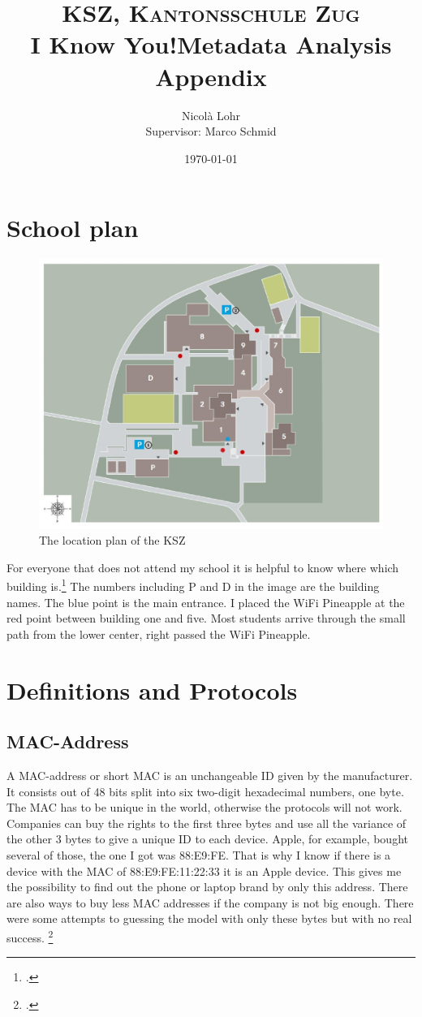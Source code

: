 \documentclass[11pt]{article}
\title{\normalfont \normalsize \textsc{KSZ, Kantonsschule Zug} \\ [25pt]
\huge I Know You!\linebreak\linebreak \large Metadata Analysis \linebreak \large Appendix\\ 
}
\author{Nicolà Lohr\\[0.5cm]{\small Supervisor: Marco Schmid}}
\date{\normalsize\today}
\begin{document}
\clearpage
\thispagestyle{empty}
\newpage
\linespread{0.9}
\tableofcontents
\linespread{1.5}
\newpage

\section {School plan}
\begin{figure}
\centering
\includegraphics [width = \textwidth]{images/lageplan.jpeg}
\caption{The location plan of the KSZ\label{fig:locationplan}}
\end{figure}

For everyone that does not attend my school it is helpful to know where which building is.\footcite{kszlageplan} The numbers including P and D in the image are the building names. The blue point is the main entrance. I placed the WiFi Pineapple at the red point between building one and five. Most students arrive through the small path from the lower center, right passed the WiFi Pineapple.

\section{Definitions and Protocols}

\subsection{MAC-Address}
A MAC-address or short MAC is an unchangeable ID given by the manufacturer. It consists out of 48 bits split into six two-digit hexadecimal numbers, one byte. The MAC has to be unique in the world, otherwise the protocols will not work. 
Companies can buy the rights to the first three bytes and use all the variance of the other 3 bytes to give a unique ID to each device. Apple, for example, bought several of those, the one I got was 88:E9:FE. That is why I know if there is a device with the MAC of 88:E9:FE:11:22:33 it is an Apple device. This gives me the possibility to find out the phone or laptop brand by only this address. There are also ways to buy less MAC addresses if the company is not big enough. There were some attempts to guessing the model with only these bytes but with no real success.
\footcite{macaddress}
\end{document}
